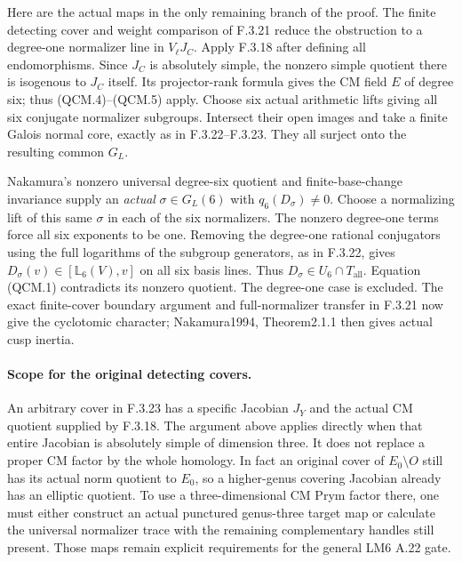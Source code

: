 Here are the actual maps in the only remaining branch
of the proof. The finite detecting cover and weight
comparison of F.3.21 reduce the obstruction to a
degree-one normalizer line in $V_\ell J_C$. Apply
F.3.18 after defining all endomorphisms. Since $J_C$
is absolutely simple, the nonzero simple quotient
there is isogenous to $J_C$ itself. Its projector-rank
formula gives the CM field $E$ of degree six; thus
(QCM.4)--(QCM.5) apply. Choose six actual arithmetic
lifts giving all six conjugate normalizer subgroups.
Intersect their open images and take a finite Galois
normal core, exactly as in F.3.22--F.3.23. They all
surject onto the resulting common $G_L$.

Nakamura's nonzero universal degree-six quotient and
finite-base-change invariance supply an \emph{actual}
$\sigma\in G_L(6)$ with $q_6(D_\sigma)\ne0$.
Choose a normalizing lift of this same $\sigma$ in
each of the six normalizers. The nonzero degree-one
terms force all six exponents to be one. Removing
the degree-one rational conjugators using the full
logarithms of the subgroup generators, as in F.3.22,
gives $D_\sigma(v)\in[\mathbb L_6(V),v]$ on all six
basis lines. Thus
$D_\sigma\in U_6\cap T_{\mathrm{all}}$.
Equation (QCM.1) contradicts its nonzero quotient.
The degree-one case is excluded. The exact finite-cover
boundary argument and full-normalizer transfer in
F.3.21 now give the cyclotomic character; Nakamura1994,
Theorem2.1.1 then gives actual cusp inertia.

\paragraph{Scope for the original detecting covers.}
An arbitrary cover in F.3.23 has a specific Jacobian
$J_Y$ and the actual CM quotient supplied by F.3.18.
The argument above applies directly when that entire
Jacobian is absolutely simple of dimension three.
It does not replace a proper CM factor by the whole
homology. In fact an original cover of $E_0\setminus O$
still has its actual norm quotient to $E_0$, so a
higher-genus covering Jacobian already has an elliptic
quotient. To use a three-dimensional CM Prym factor
there, one must either construct an actual punctured
genus-three target map or calculate the universal
normalizer trace with the remaining complementary
handles still present. Those maps remain explicit
requirements for the general LM6 A.22 gate.
